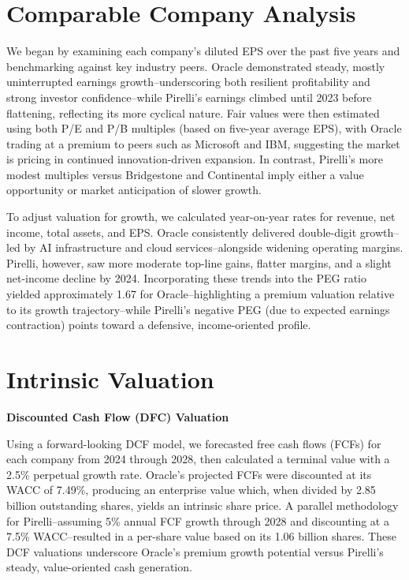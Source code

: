 \documentclass[12pt,a4paper]{report}
\begin{document}
\section{Comparable Company Analysis}
We began by examining each company's diluted EPS over the past five years and benchmarking against key industry peers. Oracle demonstrated steady, mostly uninterrupted earnings growth--underscoring both resilient profitability and strong investor confidence--while Pirelli's earnings climbed until 2023 before flattening, reflecting its more cyclical nature. Fair values were then estimated using both P/E and P/B multiples (based on five-year average EPS), with Oracle trading at a premium to peers such as Microsoft and IBM, suggesting the market is pricing in continued innovation-driven expansion. In contrast, Pirelli's more modest multiples versus Bridgestone and Continental imply either a value opportunity or market anticipation of slower growth.

To adjust valuation for growth, we calculated year-on-year rates for revenue, net income, total assets, and EPS. Oracle consistently delivered double-digit growth--led by AI infrastructure and cloud services--alongside widening operating margins. Pirelli, however, saw more moderate top-line gains, flatter margins, and a slight net-income decline by 2024. Incorporating these trends into the PEG ratio yielded approximately 1.67 for Oracle--highlighting a premium valuation relative to its growth trajectory--while Pirelli's negative PEG (due to expected earnings contraction) points toward a defensive, income-oriented profile.

\section{Intrinsic Valuation}
\textbf{Discounted Cash Flow (DFC) Valuation}

Using a forward-looking DCF model, we forecasted free cash flows (FCFs) for each company from 2024 through 2028, then calculated a terminal value with a 2.5\% perpetual growth rate. Oracle's projected FCFs were discounted at its WACC of 7.49\%, producing an enterprise value which, when divided by 2.85 billion outstanding shares, yields an intrinsic share price. A parallel methodology for Pirelli--assuming 5\% annual FCF growth through 2028 and discounting at a 7.5\% WACC--resulted in a per-share value based on its 1.06 billion shares. These DCF valuations underscore Oracle's premium growth potential versus Pirelli's steady, value-oriented cash generation.\\
\end{document}

